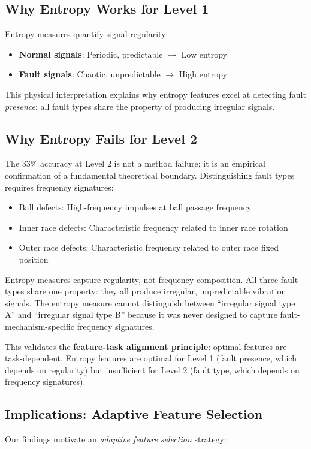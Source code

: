 \documentclass[11pt]{article}
\begin{document}
\subsection{Why Entropy Works for Level 1}
Entropy measures quantify signal regularity:
\begin{itemize}
    \item \textbf{Normal signals}: Periodic, predictable $\rightarrow$ Low entropy
    \item \textbf{Fault signals}: Chaotic, unpredictable $\rightarrow$ High entropy
\end{itemize}

This physical interpretation explains why entropy features excel at detecting fault \emph{presence}: all fault types share the property of producing irregular signals.

\subsection{Why Entropy Fails for Level 2}
The 33\% accuracy at Level 2 is not a method failure; it is an empirical confirmation of a fundamental theoretical boundary. Distinguishing fault types requires frequency signatures:
\begin{itemize}
    \item Ball defects: High-frequency impulses at ball passage frequency
    \item Inner race defects: Characteristic frequency related to inner race rotation
    \item Outer race defects: Characteristic frequency related to outer race fixed position
\end{itemize}

Entropy measures capture regularity, not frequency composition. All three fault types share one property: they all produce irregular, unpredictable vibration signals. The entropy measure cannot distinguish between ``irregular signal type A'' and ``irregular signal type B'' because it was never designed to capture fault-mechanism-specific frequency signatures.

This validates the \textbf{feature-task alignment principle}: optimal features are task-dependent. Entropy features are optimal for Level 1 (fault presence, which depends on regularity) but insufficient for Level 2 (fault type, which depends on frequency signatures).

\subsection{Implications: Adaptive Feature Selection}
Our findings motivate an \emph{adaptive feature selection} strategy:
\end{document}
